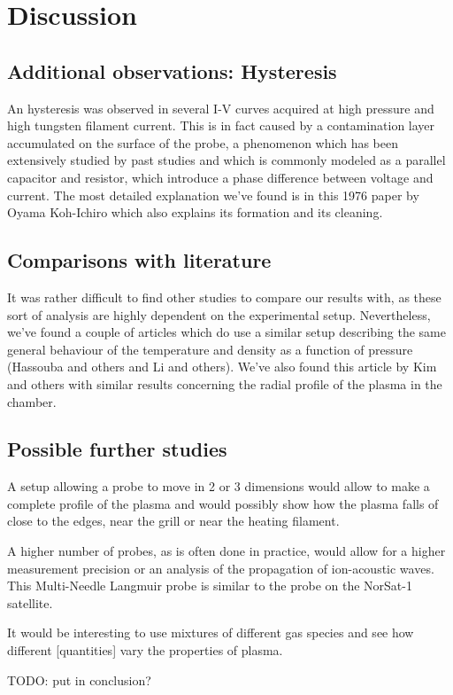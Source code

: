 \section{Discussion}

\subsection{Additional observations: Hysteresis}
An hysteresis was observed in several I-V curves acquired at high pressure and high tungsten filament current.
This is in fact caused by a contamination layer accumulated on the surface of the probe, a phenomenon which has been extensively studied by past studies and which is commonly modeled as a parallel capacitor and resistor, which introduce a phase difference between voltage and current.
The most detailed explanation we've found is in this 1976 paper by Oyama Koh-Ichiro
which also explains its formation and its cleaning.

\subsection{Comparisons with literature}
It was rather difficult to find other studies to compare our results with, as these sort of analysis are highly dependent on the experimental setup.
Nevertheless, we've found a couple of articles which do use a similar setup describing the same general behaviour of the temperature and density as a function of pressure (Hassouba and others and Li and others). 
We've also found this article by Kim and others with similar results concerning the radial profile of the plasma in the chamber.

\subsection{Possible further studies}
A setup allowing a probe to move in 2 or 3 dimensions would allow to make a complete profile of the plasma and would possibly show how the plasma falls of close to the edges, near the grill or near the heating filament.

A higher number of probes, as is often done in practice, would allow for a higher measurement precision or an analysis of the propagation of ion-acoustic waves. This Multi-Needle Langmuir probe is similar to the probe on the NorSat-1 satellite.

It would be interesting to use mixtures of different gas species and see how different [quantities] vary the properties of plasma.

TODO: put in conclusion?